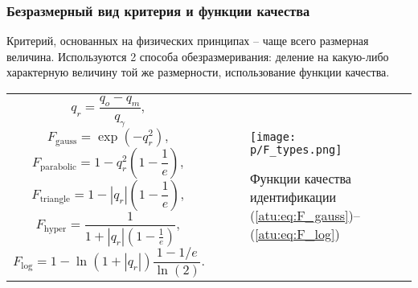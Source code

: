 \documentclass[10pt,utf8]{beamer}
\newlength\TW
\begin{document}
\begin{frame}[fragile]
  \frametitle{Безразмерный вид критерия и функции качества}

  Критерий, основанных на физических принципах -- чаще всего размерная величина.
  Используются 2 способа обезразмеривания: деление
  на какую-либо характерную величину той же размерности,
  использование функции качества.

  \begin{tabular}{p{45\TW}|p{52\TW}}
  \[
      q_r = \frac{q_o - q_m}{q_\gamma},
  \]
  \begin{equation}
    F_{\mathrm{gauss}} = \exp( - q_r^2 ),
  \label{atu:eq:F_gauss}
  \end{equation}
  \begin{equation}
    F_{\mathrm{parabolic}} = 1 - q_r^2 \left( 1 - \frac{1}{e} \right),
  \label{atu:eq:F_parabolic}
  \end{equation}
  \begin{equation}
    F_{\mathrm{triangle}} = 1 - |q_r| \left( 1 - \frac{1}{e} \right),
  \label{atu:eq:F_triangle}
  \end{equation}
  \begin{equation}
    F_{\mathrm{hyper}} = \frac{1}{ 1 + |q_r| \left( 1 - \frac{1}{e} \right)},
  \label{atu:eq:F_hyper}
  \end{equation}
  \begin{equation}
    F_{\mathrm{log}} = 1 - \ln \left( 1 + |q_r| \right) \frac{1-1/e}{\ln(2)}.
  \label{atu:eq:F_log}
  \end{equation}
 &
  \begin{figure}[htb!]
    \centerline{\texttt{[image: p/F\_types.png]} }
    \caption{Функции качества идентификации (\ref{atu:eq:F_gauss})--(\ref{atu:eq:F_log})}
    \label{atu:f:F_types}
  \end{figure}
  \end{tabular}



\end{frame}

\end{document}
